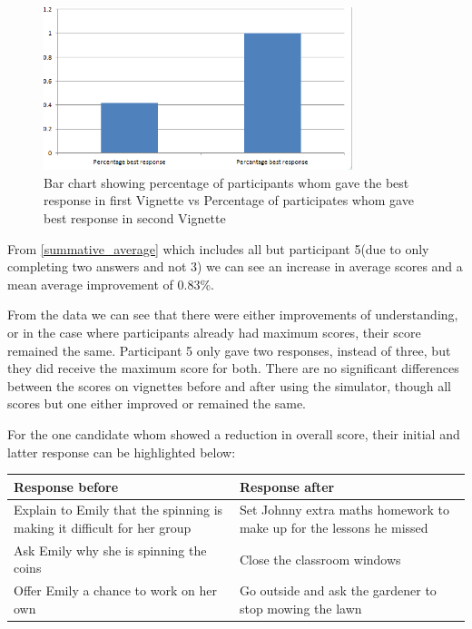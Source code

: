 \documentclass[11pt]{report}
\begin{document}
\begin{figure}[H]
\centering
\includegraphics[width=90mm]{images/summative/bestresponse.png}
\caption{Bar chart showing percentage of participants whom gave the best response in first Vignette vs Percentage of participates whom gave best response in second Vignette}
\label{summative_bestresponse}
\end{figure}

From \ref{summative_average} which includes all but participant 5(due to only completing two answers and not 3) we can see an increase in average scores and a mean average improvement of 0.83\%.

From the data we can see that there were either improvements of understanding, or in the case where participants already had maximum scores, their score remained the same. Participant 5 only gave two responses, instead of three, but they did receive the maximum score for both. There are no significant differences between the scores on vignettes before and after using the simulator, though all scores but one either improved or remained the same. 

For the one candidate whom showed a reduction in overall score, their initial and latter response can be highlighted below:

\begin{table}[H]
    \begin{tabular}{| p{6cm} | p{6cm} |}
    \hline
    \textbf{Response before} & \textbf{Response after}  \\                                                                                                                                                                                    
	\hline
	\hline
	Explain to Emily that the spinning is making it difficult for her group & Set Johnny extra maths homework to make up for the lessons he missed \\ \hline
	Ask Emily why she is spinning the coins & Close the classroom windows \\ \hline
	Offer Emily a chance to work on her own & Go outside and ask the gardener to stop mowing the lawn \\ 
    \hline
    \end{tabular}
\end{table}
\end{document}
